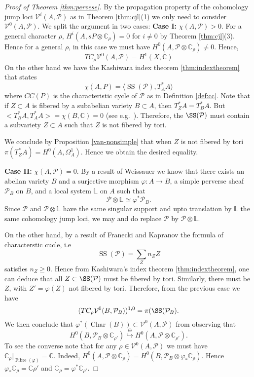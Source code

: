 \documentclass[12pt,reqno]{amsart}
\theoremstyle{question}
\theoremstyle{definition}
\theoremstyle{remark}
\theoremstyle{cited}
\theoremstyle{citeddef}
\DeclareMathOperator{\Char}{Char}
\DeclareMathOperator{\CC}{SS}
\newcommand{\sP}{\mathcal{P}}
\newcommand\sV{{\mathcal V}}
\newcommand{\bbC}{\mathbb{C}}
\newcommand{\bbL}{\mathbb{L}}
\newcommand{\into}{\hookrightarrow}
\begin{document}
\begin{proof}[Proof of Theorem \ref{thm:pervese}]
By the propagation property of the cohomology jump loci
$\sV^i(A, \sP)$ as in Theorem \ref{thm:cjl}(1) we
only need to consider $\sV^0(A,\sP)$. We split the argument in 
two cases:
\noindent \textbf{Case I: }$\chi(A, \sP)>0$. 
For a general character $\rho$, $H^i(A, sP\otimes \bbC_{\rho})= 0$ for $i\neq 0$ by Theorem \ref{thm:cjl}(3). Hence for a general
$\rho$,
in this case we must have $H^0(A, \sP\otimes \bbC_{\rho})\neq 0$. Hence, 
\[TC_{\rho}\sV^0(A, \sP) = H^1(X,\bbC)\]
On the other hand we have
the Kashiwara index theorem \ref{thm:indextheorem}
that states
\[\chi(A,P) = \langle \CC(\sP), T^*_AA\rangle\]
where $CC(P)$ is the characteristic cycle of $\sP$ as
in Definition \ref{def:cc}.
Note that if $Z\subset A$ is fibered by a subabelian variety $B\subset A$, then $T^*_ZA = T^*_BA$. But $<T^*_BA, T^*_AA> = \chi(B, \bbC) = 0$ (see e.g.\ \cite[p.\ 124]{Dim}).  Therefore,
the $\SS(\sP)$ must contain a subvariety $Z\subset A$ such that
$Z$ is not fibered by tori. 

We conclude by Proposition \ref{van-nonsimple} that when $Z$ is not fibered by tori $\pi(T^*_ZA) = H^0(A,\Omega_A^1)$. Hence
we obtain the desired equality.

\noindent \textbf{Case II: } $\chi(A, \sP)=0$. 
By a result of Weissauer \cite[Theorem 2]{Wei}
we know that there exists an abelian variety $B$ and a surjective morphism $\varphi\colon A\to B$, a simple perverse sheaf $\sP_B$ on $B$, and a local system $\bbL$ on $A$
such that 
\[\sP\otimes \bbL\simeq \varphi^*\sP_B.\]
Since $\sP$ and $\sP\otimes \bbL$ have the same singular support
and upto translation by $\bbL$ the same cohomology jump loci, we 
may and do replace $\sP$ by $\sP\otimes \bbL$.

On the other hand, by a result of
Franecki and Kapranov
\cite[Corollary 1.4]{FK} the formula of
characterstic cucle, i.e\ \[\CC(\sP) = \sum_Z n_Z Z\]
satisfies $n_Z\geq 0$. Hence from Kashiwara's index theorem 
\ref{thm:indextheorem}, one can deduce that all $Z\subset \SS(\sP)$ must be fibered by tori. Similarly, there must be 
$Z$, with $Z' = \varphi(Z)$ not fibered by tori.
Therefore, from the previous case we have 
\[(TC_{\rho}\sV^0(B, \sP_B))^{1,0} = \pi(\SS(\sP_B).\]
We then conclude 
that $\varphi^*(\Char(B))\subset \sV^0(A, \sP)$ from observing that
\[H^0(B, \sP_B\otimes \bbC_{\rho'}) \overset{\oplus}{\into}
H^0(A, \sP\otimes \bbC_{\rho'}).\]
To see the converse note that 
for any $\rho \in \sV^0(A, \sP)$ we must 
have $\bbC_{\rho}|_{\operatorname{Fibre}(\varphi)} = \bbC$.
Indeed, $H^0(A, \sP\otimes \bbC_{\rho}) = H^0(B, \sP_B\otimes \varphi_*\bbC_{\rho})$.
Hence $\varphi_*\bbC_{\rho} = \bbC{\rho'}$ and $\bbC_{\rho} = 
\varphi^*\bbC_{\rho'}$.







\end{proof}
\end{document}
